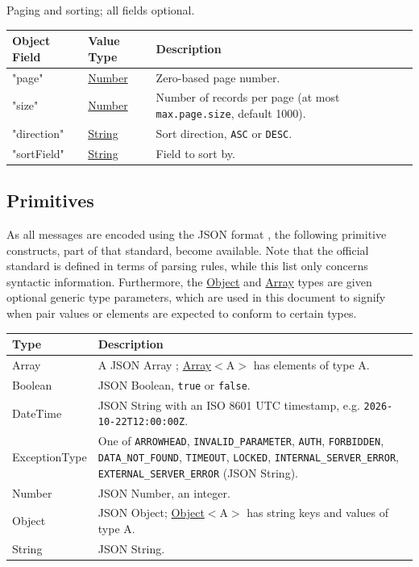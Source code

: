 \documentclass[a4paper]{arrowhead}
\newcommand{\pdef}[1]{{\textcolor{ArrowheadGrey}{#1 \label{sec:model:primitives:#1} \label{sec:model:primitives:#1s}}}}
\newcommand{\pref}[1]{{\textcolor{ArrowheadGrey}{\hyperref[sec:model:primitives:#1]{#1}}}}
\begin{document}

Paging and sorting; all fields optional.


\noindent\begin{tabularx}{\textwidth}{| >{\raggedright\arraybackslash}p{3.9cm} | >{\raggedright\arraybackslash\small}p{5.3cm} | X |} \hline
\rowcolor{gray!33} Object Field & Value Type & Description \\ \hline
"page" & \pref{Number} & Zero-based page number. \\ \hline
"size" & \pref{Number} & Number of records per page (at most \texttt{max.\allowbreak{}page.\allowbreak{}size}, default 1000). \\ \hline
"direction" & \pref{String} & Sort direction, \texttt{ASC} or \texttt{DESC}. \\ \hline
"sort\allowbreak{}Field" & \pref{String} & Field to sort by. \\ \hline
\end{tabularx}



\subsection{Primitives}
\label{sec:model:primitives}

As all messages are encoded using the JSON format \cite{rfc8259}, the following primitive constructs, part of that standard, become available.
Note that the official standard is defined in terms of parsing rules, while this list only concerns syntactic information.
Furthermore, the \pref{Object} and \pref{Array} types are given optional generic type parameters, which are used in this document to signify when pair values or elements are expected to conform to certain types.

\noindent\begin{tabularx}{\textwidth}{| p{4.6cm} | X |} \hline
\rowcolor{gray!33} Type & Description \\ \hline
\pdef{Array} & A JSON Array \cite{rfc8259}; \pref{Array}$<$A$>$ has elements of type A. \\ \hline
\pdef{Boolean} & JSON Boolean, \texttt{true} or \texttt{false}. \\ \hline
\pdef{DateTime} & JSON String with an ISO 8601 UTC timestamp, e.g. \texttt{2026-10-22T12:00:00Z}. \\ \hline
\pdef{ExceptionType} & One of \texttt{ARROWHEAD}, \texttt{INVALID\_\allowbreak{}PARAMETER}, \texttt{AUTH}, \texttt{FORBIDDEN}, \texttt{DATA\_\allowbreak{}NOT\_\allowbreak{}FOUND}, \texttt{TIMEOUT}, \texttt{LOCKED}, \texttt{INTERNAL\_\allowbreak{}SERVER\_\allowbreak{}ERROR}, \texttt{EXTERNAL\_\allowbreak{}SERVER\_\allowbreak{}ERROR} (JSON String). \\ \hline
\pdef{Number} & JSON Number, an integer. \\ \hline
\pdef{Object} & JSON Object; \pref{Object}$<$A$>$ has string keys and values of type A. \\ \hline
\pdef{String} & JSON String. \\ \hline
\end{tabularx}
\end{document}
